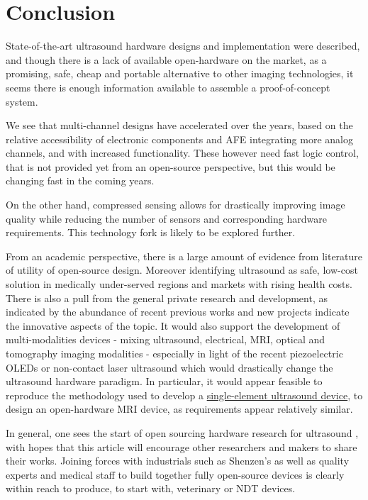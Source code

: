 \documentclass{article}
\begin{document}
\newpage
\section{Conclusion}

State-of-the-art ultrasound hardware designs and implementation were described, and though there is a lack of available open-hardware on the market, as a promising, safe, cheap and portable alternative to other imaging technologies, it seems there is enough information available to assemble a proof-of-concept system.

We see that multi-channel designs have accelerated over the years, based on the relative accessibility of electronic components and AFE integrating more analog channels, and with increased functionality. These however need fast logic control, that is not provided yet from an open-source perspective, but this would be changing fast in the coming years.

On the other hand, compressed sensing allows for drastically improving image quality while reducing the number of sensors and corresponding hardware requirements. This technology fork is likely to be explored further. 

From an academic perspective, there is a large amount of evidence from literature of utility of open-source design. Moreover identifying ultrasound as safe, low-cost solution in medically under-served regions and markets with rising health costs. There is also a pull from the general private research and development, as indicated by the abundance of recent previous works and new projects indicate the innovative aspects of the topic. It would also support the development of multi-modalities devices - mixing ultrasound, electrical, MRI, optical and tomography imaging modalities - especially in light of the recent piezoelectric OLEDs \cite{yu_direct_2020} or non-contact laser ultrasound \cite{zhang_full_2019} which would drastically change the ultrasound hardware paradigm. In particular, it would appear feasible to reproduce the methodology used to develop a \href{http://un0rick.cc}{single-element ultrasound device}, to design an open-hardware MRI device, as requirements appear relatively similar. 

In general, one sees the start of open sourcing hardware research  for ultrasound \cite{roman_open-source_2019}, with hopes that this article will encourage other researchers and makers to share their works. Joining forces with industrials such as Shenzen's as well as quality experts and medical staff to build together fully open-source devices is clearly within reach to produce, to start with, veterinary or NDT devices.
\end{document}
